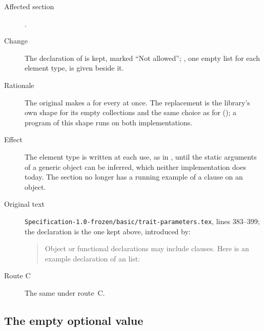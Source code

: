 \begin{description}
\item[Affected section] .
\item[Change] The declaration of  is kept, marked
``Not allowed''; , one empty list
for each element type, is given beside it.
\item[Rationale] The original makes  a
 for every  at once.
The replacement is the library's own shape for its empty collections and
the same choice as for  (); a program
of this shape runs on both implementations.
\item[Effect] The element type is written at each use, as in
, until the static
arguments of a generic object can be inferred, which neither
implementation does today. The section no longer has a running example of
a  clause on an object.
\item[Original text] \nolinkurl{Specification-1.0-frozen/basic/trait-parameters.tex},
lines 383--399; the declaration is the one kept above, introduced by:
\begin{quote}
Object or functional declarations may include  clauses.
Here is an example declaration of an  list:
\end{quote}
\item[Route C] The same under route~C.
\end{description}

\subsection{The empty optional value}


